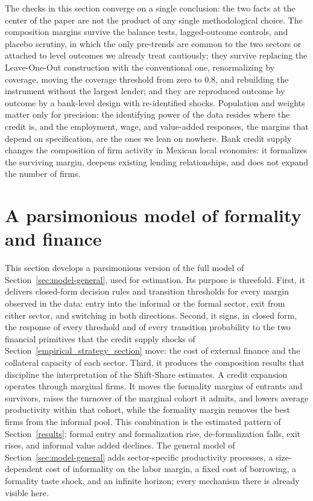 \documentclass[12pt]{article}
\begin{document}
The checks in this section converge on a single conclusion: the two facts at the center of the paper are not the product of any single methodological choice. The composition margins survive the balance tests, lagged-outcome controls, and placebo scrutiny, in which the only pre-trends are common to the two sectors or attached to level outcomes we already treat cautiously; they survive replacing the Leave-One-Out construction with the conventional one, renormalizing by coverage, moving the coverage threshold from zero to 0.8, and rebuilding the instrument without the largest lender; and they are reproduced outcome by outcome by a bank-level design with re-identified shocks. Population and weights matter only for precision: the identifying power of the data resides where the credit is, and the employment, wage, and value-added responses, the margins that depend on specification, are the ones we lean on nowhere. Bank credit supply changes the composition of firm activity in Mexican local economies: it formalizes the surviving margin, deepens existing lending relationships, and does not expand the number of firms.

\section{A parsimonious model of formality and finance}
\label{sec:toy}

This section develops a parsimonious version of the full model of Section~\ref{sec:model-general}, used for estimation. Its purpose is threefold. First, it delivers closed-form decision rules and transition thresholds for every margin observed in the data: entry into the informal or the formal sector, exit from either sector, and switching in both directions. Second, it signs, in closed form, the response of every threshold and of every transition probability to the two financial primitives that the credit supply shocks of Section~\ref{empirical_strategy_section} move: the cost of external finance and the collateral capacity of each sector. Third, it produces the composition results that discipline the interpretation of the Shift-Share estimates. A credit expansion operates through marginal firms. It moves the formality margins of entrants and survivors, raises the turnover of the marginal cohort it admits, and lowers average productivity within that cohort, while the formality margin removes the best firms from the informal pool. This combination is the estimated pattern of Section~\ref{results}: formal entry and formalization rise, de-formalization falls, exit rises, and informal value added declines. The general model of Section~\ref{sec:model-general} adds sector-specific productivity processes, a size-dependent cost of informality on the labor margin, a fixed cost of borrowing, a formality taste shock, and an infinite horizon; every mechanism there is already visible here.
 
\end{document}
